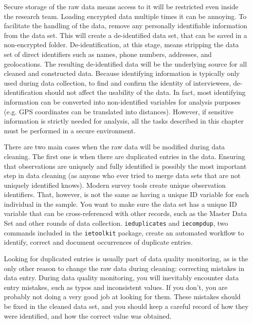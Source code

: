 Secure storage of the raw
data means access to it will be restricted even inside the research team.
Loading encrypted data multiple times it can be annoying.
To facilitate the handling of the data, remove any personally identifiable information from the data set.
This will create a de-identified data set, that can be saved in a non-encrypted folder. 
De-identification,
at this stage, means stripping the data set of direct identifiers such as names, phone numbers, addresses, and geolocations.
The resulting de-identified data will be the underlying source for all cleaned and constructed data.
Because identifying information is typically only used during data collection, 
to find and confirm the identity of interviewees, 
de-identification should not affect the usability of the data.
In fact, most identifying information can be converted into non-identified variables for analysis purposes
(e.g. GPS coordinates can be translated into distances). 
However, if sensitive information is strictly needed for analysis,
all the tasks described in this chapter must be performed in a secure environment.

There are two main cases when the raw data will be modified during data cleaning.
The first one is when there are duplicated entries in the data.
Ensuring that observations are uniquely and fully identified
is possibly the most important step in data cleaning
(as anyone who ever tried to merge data sets that are not uniquely identified knows).
Modern survey tools create unique observation identifiers.
That, however, is not the same as having a unique ID variable for each individual in the sample.
You want to make sure the data set has a unique ID variable
that can be cross-referenced with other records, such as the Master Data Set
and other rounds of data collection.
\texttt{ieduplicates} and \texttt{iecompdup}, 
two commands  included in the \texttt{ietoolkit} package,
create an automated workflow to identify, correct and document
occurrences of duplicate entries. 

Looking for duplicated entries is usually part of data quality monitoring,
as is the only other reason to change the raw data during cleaning:
correcting mistakes in data entry.
During data quality monitoring, you will inevitably encounter data entry mistakes,
such as typos and inconsistent values.
If you don't, you are probably not doing a very good job at looking for them.
These mistakes should be fixed in the cleaned data set,
and you should keep a careful record of how they were identified,
and how the correct value was obtained.

